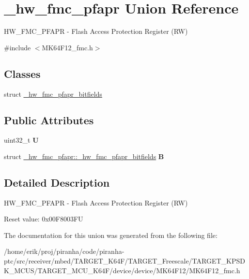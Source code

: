 \hypertarget{union__hw__fmc__pfapr}{}\section{\+\_\+hw\+\_\+fmc\+\_\+pfapr Union Reference}
\label{union__hw__fmc__pfapr}


H\+W\+\_\+\+F\+M\+C\+\_\+\+P\+F\+A\+PR -\/ Flash Access Protection Register (RW)  




{\ttfamily \#include $<$M\+K64\+F12\+\_\+fmc.\+h$>$}

\subsection*{Classes}
\begin{DoxyCompactItemize}
\item 
struct \hyperlink{struct__hw__fmc__pfapr_1_1__hw__fmc__pfapr__bitfields}{\+\_\+hw\+\_\+fmc\+\_\+pfapr\+\_\+bitfields}
\end{DoxyCompactItemize}
\subsection*{Public Attributes}
\begin{DoxyCompactItemize}
\item 
uint32\+\_\+t {\bfseries U}\hypertarget{union__hw__fmc__pfapr_a5bdcbe4699bcc0ca21e4b970f7da46b8}{}\label{union__hw__fmc__pfapr_a5bdcbe4699bcc0ca21e4b970f7da46b8}

\item 
struct \hyperlink{struct__hw__fmc__pfapr_1_1__hw__fmc__pfapr__bitfields}{\+\_\+hw\+\_\+fmc\+\_\+pfapr\+::\+\_\+hw\+\_\+fmc\+\_\+pfapr\+\_\+bitfields} {\bfseries B}\hypertarget{union__hw__fmc__pfapr_a98d5403637334c3695c1248a0b23f354}{}\label{union__hw__fmc__pfapr_a98d5403637334c3695c1248a0b23f354}

\end{DoxyCompactItemize}


\subsection{Detailed Description}
H\+W\+\_\+\+F\+M\+C\+\_\+\+P\+F\+A\+PR -\/ Flash Access Protection Register (RW) 

Reset value\+: 0x00\+F8003\+FU 

The documentation for this union was generated from the following file\+:\begin{DoxyCompactItemize}
\item 
/home/erik/proj/piranha/code/piranha-\/ptc/src/receiver/mbed/\+T\+A\+R\+G\+E\+T\+\_\+\+K64\+F/\+T\+A\+R\+G\+E\+T\+\_\+\+Freescale/\+T\+A\+R\+G\+E\+T\+\_\+\+K\+P\+S\+D\+K\+\_\+\+M\+C\+U\+S/\+T\+A\+R\+G\+E\+T\+\_\+\+M\+C\+U\+\_\+\+K64\+F/device/device/\+M\+K64\+F12/M\+K64\+F12\+\_\+fmc.\+h\end{DoxyCompactItemize}
